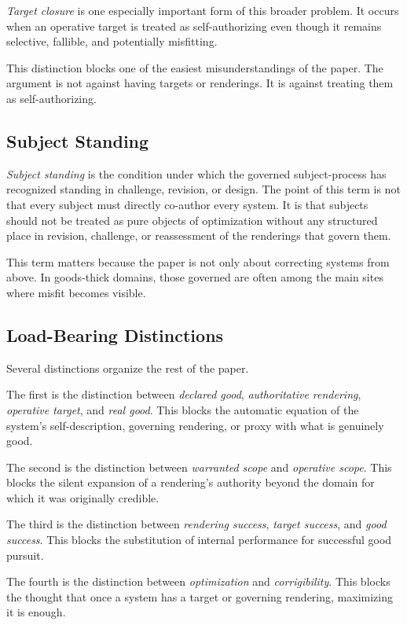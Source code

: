 \documentclass[11pt]{article}
\renewcommand{\emph}[1]{\textit{#1}}
\begin{document}
\emph{Target closure} is one especially important form of this broader problem. It occurs when an operative target is treated as self-authorizing even though it remains selective, fallible, and potentially misfitting.

This distinction blocks one of the easiest misunderstandings of the paper. The argument is not against having targets or renderings. It is against treating them as self-authorizing.

\subsection{Subject Standing}

\emph{Subject standing} is the condition under which the governed subject-process has recognized standing in challenge, revision, or design. The point of this term is not that every subject must directly co-author every system. It is that subjects should not be treated as pure objects of optimization without any structured place in revision, challenge, or reassessment of the renderings that govern them.

This term matters because the paper is not only about correcting systems from above. In goods-thick domains, those governed are often among the main sites where misfit becomes visible.

\subsection{Load-Bearing Distinctions}

Several distinctions organize the rest of the paper.

The first is the distinction between \emph{declared good}, \emph{authoritative rendering}, \emph{operative target}, and \emph{real good}. This blocks the automatic equation of the system's self-description, governing rendering, or proxy with what is genuinely good.

The second is the distinction between \emph{warranted scope} and \emph{operative scope}. This blocks the silent expansion of a rendering's authority beyond the domain for which it was originally credible.

The third is the distinction between \emph{rendering success}, \emph{target success}, and \emph{good success}. This blocks the substitution of internal performance for successful good pursuit.

The fourth is the distinction between \emph{optimization} and \emph{corrigibility}. This blocks the thought that once a system has a target or governing rendering, maximizing it is enough.
\end{document}
